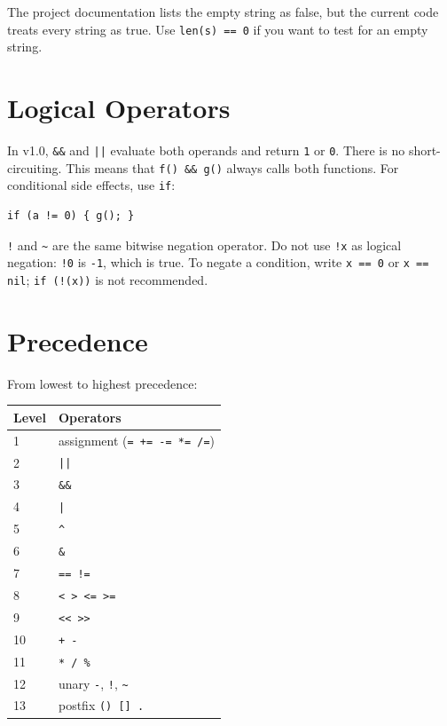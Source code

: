 \documentclass[11pt,a4paper,oneside]{report}
\newcommand{\code}[1]{\texttt{#1}}
\begin{document}
The project documentation lists the empty string as false, but the
current code treats every string as true. Use \code{len(s) == 0} if you
want to test for an empty string.

\section{Logical Operators}
In v1.0, \code{\&\&} and \code{||} evaluate both operands and return
\code{1} or \code{0}. There is no short-circuiting. This means that
\code{f() \&\& g()} always calls both functions. For conditional side
effects, use \code{if}:

\begin{lstlisting}
if (a != 0) { g(); }
\end{lstlisting}

\code{!} and \code{\textasciitilde} are the same bitwise negation
operator. Do not use \code{!x} as logical negation: \code{!0} is
\code{-1}, which is true. To negate a condition, write \code{x == 0} or
\code{x == nil}; \code{if (!(x))} is not recommended.

\section{Precedence}
From lowest to highest precedence:

\begin{center}
\begin{tabular}{ll}
\toprule
Level & Operators \\
\midrule
1 & assignment (\code{= += -= *= /=}) \\
2 & \code{||} \\
3 & \code{\&\&} \\
4 & \code{|} \\
5 & \code{\^{}} \\
6 & \code{\&} \\
7 & \code{== !=} \\
8 & \code{< > <= >=} \\
9 & \code{<< >>} \\
10 & \code{+ -} \\
11 & \code{* / \%} \\
12 & unary \code{-}, \code{!}, \code{\textasciitilde} \\
13 & postfix \code{() [] .} \\
\bottomrule
\end{tabular}
\end{center}
\end{document}
